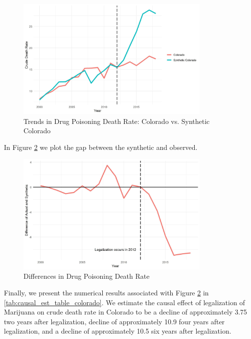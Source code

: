 \documentclass{article}
\begin{document}
\begin{figure}[H]
	\begin{center}
		\includegraphics[width=0.85\textwidth]{trends_plot_colorado}
	\end{center}
	\caption{Trends in Drug Poisoning Death Rate: Colorado vs. Synthetic Colorado}
	\label{fig:trends_plot_colorado}
\end{figure}

In Figure \ref{fig:diffs_plot_colorado} we plot the gap between the synthetic and observed.

\begin{figure}[H]
	\begin{center}
		\includegraphics[width=0.85\textwidth]{diffs_plot_colorado}
	\end{center}
	\caption{Differences in Drug Poisoning Death Rate}
	\label{fig:diffs_plot_colorado}
\end{figure}

Finally, we present the numerical results associated with Figure \ref{fig:diffs_plot_colorado} in \ref{tab:causal_est_table_colorado}. We estimate the causal effect of legalization of Marijuana on crude death rate in Colorado to be a decline of approximately 3.75 two years after legalization, decline of approximately 10.9 four years after legalization, and a decline of approximately 10.5 six years after legalization.
\end{document}
